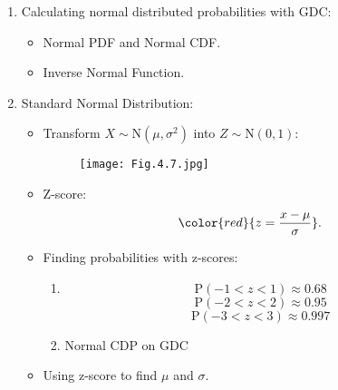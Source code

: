 \documentclass[12pt, a4paper]{article}
\def\P{\mathrm{P}}
\begin{document}
\begin{enumerate}
    \item Calculating normal distributed probabilities with GDC: 
    \begin{itemize}
        \item Normal PDF and Normal CDF.
        \item Inverse Normal Function.
    \end{itemize}
    \item Standard Normal Distribution: 
    \begin{itemize}
        \item Transform $X\sim\mathrm{N}(\mu,\sigma^2)$ into $Z\sim\mathrm{N}(0,1)$: 
        \begin{figure}[H]
            \center
            \texttt{[image: Fig.4.7.jpg]}
        \end{figure}
        \item Z-score: $${\color{red}{z=\frac{x-\mu}{\sigma}}}.$$
        \item Finding probabilities with z-scores: 
        \begin{enumerate}
            \item $$\P(-1<z<1)\approx 0.68$$
            $$\P(-2<z<2)\approx 0.95$$
            $$\P(-3<z<3)\approx 0.997$$
            \item Normal CDP on GDC
        \end{enumerate}
        \item Using z-score to find $\mu$ and $\sigma$.
    \end{itemize}
\end{enumerate}
\end{document}
